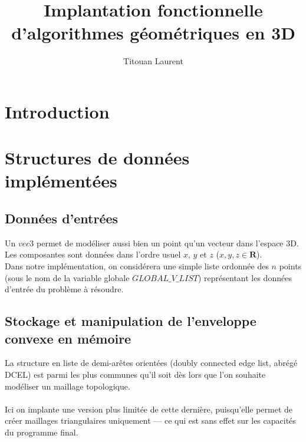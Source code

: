 \documentclass[]{article}
\title{Implantation fonctionnelle d'algorithmes géométriques en 3D}
\author{Titouan Laurent}
\date{}
\begin{document}
\maketitle

\begin{multicols}{2}

\section{Introduction}
\section{Structures de données implémentées}

\subsection{Données d'entrées}
Un $vec3$ permet de modéliser aussi bien un point qu'un vecteur dans l'espace 3D. Les composantes sont données dans l'ordre usuel $x$, $y$ et $z$ ($x, y, z \in \mathbf{R}$).\\
Dans notre implémentation, on considérera une simple liste ordonnée des $n$ points (sous le nom de la variable globale $GLOBAL\_V\_LIST$) représentant les données d'entrée du problème à résoudre.\\

\subsection{Stockage et manipulation de l'enveloppe convexe en mémoire}
La structure en liste de demi-arêtes orientées (doubly connected edge list, abrégé DCEL) est parmi les plus communes qu'il soit dès lors que l'on souhaite modéliser un maillage topologique.\\\\
Ici on implante une version plus limitée de cette dernière, puisqu'elle permet de créer maillages triangulaires uniquement — ce qui est sans effet sur les capacités du programme final.


\end{multicols}
\end{document}
